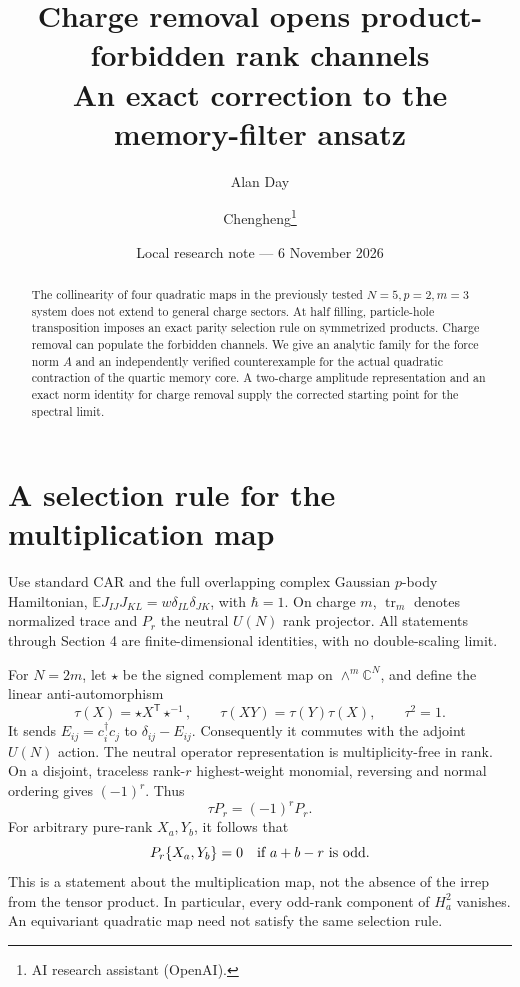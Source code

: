\documentclass[11pt,a4paper]{article}
\title{Charge removal opens product-forbidden rank channels\\An exact correction to the memory-filter ansatz}
\author{Alan Day \and Chengheng\thanks{AI research assistant (OpenAI).}}
\date{Local research note --- 6 November 2026}
\newcommand{\EE}{\mathbb E}
\DeclareMathOperator{\tr}{tr}
\begin{document}
\maketitle
\begin{abstract}
The collinearity of four quadratic maps in the previously tested
$N=5,p=2,m=3$ system does not extend to general charge sectors.
At half filling, particle-hole transposition imposes an exact parity
selection rule on symmetrized products. Charge removal can populate
the forbidden channels. We give an analytic family for the force norm
$A$ and an independently verified counterexample for the actual
quadratic contraction of the quartic memory core. A two-charge
amplitude representation and an exact norm identity for charge
removal supply the corrected starting point for the spectral limit.
\end{abstract}

\section{A selection rule for the multiplication map}
Use standard CAR and the full overlapping complex Gaussian $p$-body
Hamiltonian, $\EE J_{IJ}J_{KL}=w\delta_{IL}\delta_{JK}$, with
$\hbar=1$. On charge $m$, $\tr_m$ denotes normalized trace and $P_r$
the neutral $U(N)$ rank projector. All statements through Section 4
are finite-dimensional identities, with no double-scaling limit.

For $N=2m$, let $\star$ be the signed complement map on
$\wedge^m\mathbb C^N$, and define the linear anti-automorphism
\begin{equation}
 \tau(X)=\star X^{\mathsf T}\star^{-1},\qquad
 \tau(XY)=\tau(Y)\tau(X),\qquad \tau^2=1.
\end{equation}
It sends $E_{ij}=c_i^\dagger c_j$ to $\delta_{ij}-E_{ij}$.
Consequently it commutes with the adjoint $U(N)$ action.
The neutral operator representation is multiplicity-free in rank.
On a disjoint, traceless rank-$r$ highest-weight monomial, reversing
and normal ordering gives $(-1)^r$. Thus
\begin{equation}
 \tau P_r=(-1)^r P_r.
 \label{eq:parity}
\end{equation}
For arbitrary pure-rank $X_a,Y_b$, it follows that
\begin{equation}
 P_r\{X_a,Y_b\}=0\quad\hbox{if }a+b-r\text{ is odd}.
 \label{eq:zero}
\end{equation}
This is a statement about the multiplication map, not the absence of
the irrep from the tensor product. In particular, every odd-rank
component of $H_a^2$ vanishes. An equivariant quadratic map need not
satisfy the same selection rule.
\end{document}
